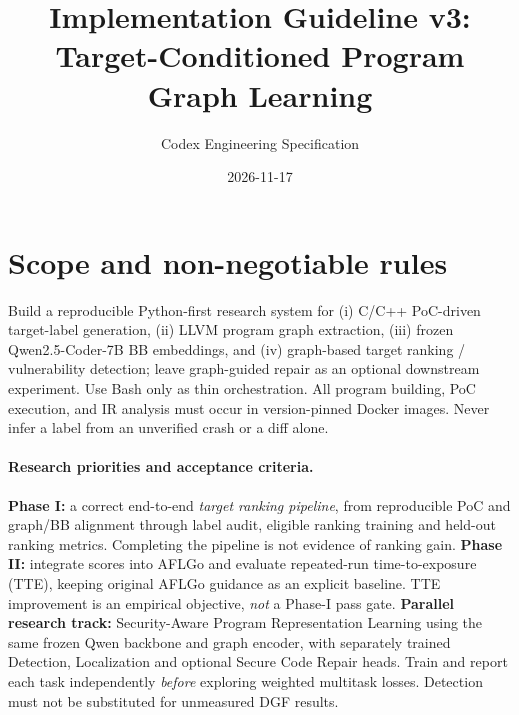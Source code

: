 \documentclass[10pt,a4paper]{article}
\title{Implementation Guideline v3: Target-Conditioned Program Graph Learning}
\author{Codex Engineering Specification}
\date{2026-11-17}
\begin{document}
\maketitle
\vspace{-1.2em}
\section{Scope and non-negotiable rules}
Build a reproducible Python-first research system for (i) C/C++ PoC-driven target-label generation, (ii) LLVM program graph extraction, (iii) frozen Qwen2.5-Coder-7B BB embeddings, and (iv) graph-based target ranking / vulnerability detection; leave graph-guided repair as an optional downstream experiment. Use Bash only as thin orchestration. All program building, PoC execution, and IR analysis must occur in version-pinned Docker images. Never infer a label from an unverified crash or a diff alone.

\paragraph{Research priorities and acceptance criteria.}
\textbf{Phase I:} a correct end-to-end \emph{target ranking pipeline}, from reproducible PoC and graph/BB alignment through label audit, eligible ranking training and held-out ranking metrics. Completing the pipeline is not evidence of ranking gain. \textbf{Phase II:} integrate scores into AFLGo and evaluate repeated-run time-to-exposure (TTE), keeping original AFLGo guidance as an explicit baseline. TTE improvement is an empirical objective, \emph{not} a Phase-I pass gate. \textbf{Parallel research track:} Security-Aware Program Representation Learning using the same frozen Qwen backbone and graph encoder, with separately trained Detection, Localization and optional Secure Code Repair heads. Train and report each task independently \emph{before} exploring weighted multitask losses. Detection must not be substituted for unmeasured DGF results.
\end{document}
